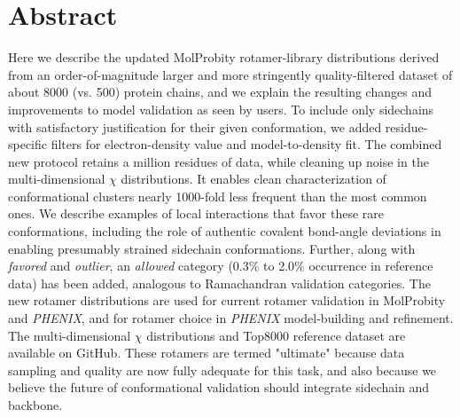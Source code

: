 \section{Abstract}

Here we describe the updated MolProbity rotamer-library distributions derived from an order-of-magnitude larger and more stringently quality-filtered dataset of about 8000 (vs. 500) protein chains, and we explain the resulting changes and improvements to model validation as seen by users. To include only sidechains with satisfactory justification for their given conformation, we added residue-specific filters for electron-density value and model-to-density fit.  The combined new protocol retains a million residues of data, while cleaning up noise in the multi-dimensional $\chi$ distributions.  It enables clean characterization of conformational clusters nearly 1000-fold less frequent than the most common ones.  We describe examples of local interactions that favor these rare conformations, including the role of authentic covalent bond-angle deviations in enabling presumably strained sidechain conformations. Further, along with \textit{favored} and \textit{outlier}, an \textit{allowed} category (0.3\% to 2.0\% occurrence in reference data) has been added, analogous to Ramachandran validation categories. The new rotamer distributions are used for current rotamer validation in MolProbity and \textit{PHENIX}, and for rotamer choice in \textit{PHENIX} model-building and refinement. The multi-dimensional $\chi$ distributions and Top8000 reference dataset are available on GitHub. These rotamers are termed "ultimate" because data sampling and quality are now fully adequate for this task, and also because we believe the future of conformational validation should integrate sidechain and backbone.